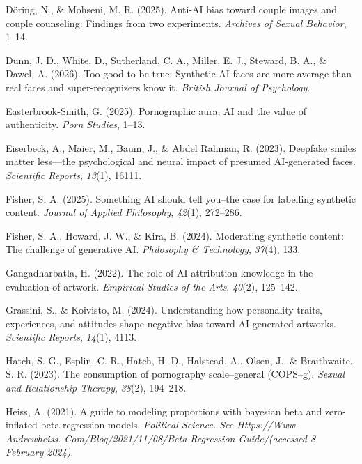 \documentclass[
  jou,
  floatsintext,
  longtable,
  nolmodern,
  notxfonts,
  notimes,
  colorlinks=true,linkcolor=blue,citecolor=blue,urlcolor=blue]{apa7}
\newlength{\cslhangindent}
\newenvironment{CSLReferences}[2] %
 {\begin{list}{}{%
  \setlength{\itemindent}{0pt}
  \setlength{\leftmargin}{0pt}
  \setlength{\parsep}{0pt}
  \ifodd #1
   \setlength{\leftmargin}{\cslhangindent}
   \setlength{\itemindent}{-1\cslhangindent}
  \fi
  \setlength{\itemsep}{#2\baselineskip}}}
 {\end{list}}
\begin{document}
\begin{CSLReferences}{1}{0}
Döring, N., \& Mohseni, M. R. (2025). Anti-AI bias toward couple images
and couple counseling: Findings from two experiments. \emph{Archives of
Sexual Behavior}, 1--14.

Dunn, J. D., White, D., Sutherland, C. A., Miller, E. J., Steward, B.
A., \& Dawel, A. (2026). Too good to be true: Synthetic AI faces are
more average than real faces and super-recognizers know it.
\emph{British Journal of Psychology}.

Easterbrook-Smith, G. (2025). Pornographic aura, AI and the value of
authenticity. \emph{Porn Studies}, 1--13.

Eiserbeck, A., Maier, M., Baum, J., \& Abdel Rahman, R. (2023). Deepfake
smiles matter less---the psychological and neural impact of presumed
AI-generated faces. \emph{Scientific Reports}, \emph{13}(1), 16111.

Fisher, S. A. (2025). Something AI should tell you--the case for
labelling synthetic content. \emph{Journal of Applied Philosophy},
\emph{42}(1), 272--286.

Fisher, S. A., Howard, J. W., \& Kira, B. (2024). Moderating synthetic
content: The challenge of generative AI. \emph{Philosophy \&
Technology}, \emph{37}(4), 133.

Gangadharbatla, H. (2022). The role of AI attribution knowledge in the
evaluation of artwork. \emph{Empirical Studies of the Arts},
\emph{40}(2), 125--142.

Grassini, S., \& Koivisto, M. (2024). Understanding how personality
traits, experiences, and attitudes shape negative bias toward
AI-generated artworks. \emph{Scientific Reports}, \emph{14}(1), 4113.

Hatch, S. G., Esplin, C. R., Hatch, H. D., Halstead, A., Olsen, J., \&
Braithwaite, S. R. (2023). The consumption of pornography scale--general
(COPS--g). \emph{Sexual and Relationship Therapy}, \emph{38}(2),
194--218.

Heiss, A. (2021). A guide to modeling proportions with bayesian beta and
zero-inflated beta regression models. \emph{Political Science. See
Https://Www. Andrewheiss.
Com/Blog/2021/11/08/Beta-Regression-Guide/(accessed 8 February 2024)}.


\end{CSLReferences}
\end{document}
